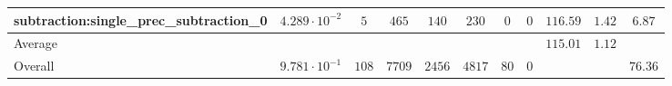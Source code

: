 \begin{tabular}{|l|c|c|c|c|c|c|c|c|c|c|}
subtraction:single\_prec\_subtraction\_0         & $ 4.289 \cdot 10^{-2} $ & $ 5      $ & $ 465  $ & $ 140  $ & $ 230   $ & $ 0  $ & $ 0 $ & $ 116.59      $ & $ 1.42    $ & $ 6.87    $ \\
\hline
Average                                          & $                     $ & $        $ & $      $ & $      $ & $       $ & $    $ & $   $ & $ 115.01      $ & $ 1.12    $ & $         $ \\
\hline
Overall                                          & $ 9.781 \cdot 10^{-1} $ & $ 108    $ & $ 7709 $ & $ 2456 $ & $ 4817  $ & $ 80 $ & $ 0 $ & $             $ & $         $ & $ 76.36   $ \\
\hline
\end{tabular}

